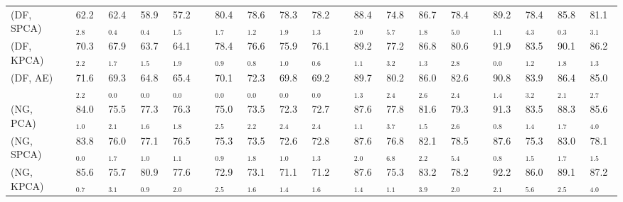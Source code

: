 \begin{table*}[!t]
{\begin{tabular}{llllllllllllllllllllll}
\multicolumn{2}{l}{(DF, SPCA)}         &  & 62.2$_{2.8}$          & 62.4$_{0.4}$          & 58.9$_{0.4}$          & 57.2$_{1.5}$          &  & 80.4$_{1.7}$          & 78.6$_{1.2}$          & 78.3$_{1.9}$          & 78.2$_{1.3}$          &  & 88.4$_{2.0}$          & 74.8$_{5.7}$          & 86.7$_{1.8}$          & 78.4$_{5.0}$          &  & 89.2$_{1.1}$          & 78.4$_{4.3}$          & 85.8$_{0.3}$          & 81.1$_{3.1}$          \\
\multicolumn{2}{l}{(DF, KPCA)}         &  & 70.3$_{2.2}$          & 67.9$_{1.7}$          & 63.7$_{1.5}$          & 64.1$_{1.9}$          &  & 78.4$_{0.9}$          & 76.6$_{0.8}$          & 75.9$_{1.0}$          & 76.1$_{0.6}$          &  & 89.2$_{1.1}$          & 77.2$_{3.2}$          & 86.8$_{1.3}$          & 80.6$_{2.8}$          &  & 91.9$_{0.0}$          & 83.5$_{1.2}$          & 90.1$_{1.8}$          & 86.2$_{1.3}$          \\
\multicolumn{2}{l}{(DF, AE)}           &  & 71.6$_{2.2}$          & 69.3$_{0.0}$          & 64.8$_{0.0}$          & 65.4$_{0.0}$          &  & 70.1$_{0.0}$          & 72.3$_{0.0}$          & 69.8$_{0.0}$          & 69.2$_{0.0}$          &  & 89.7$_{1.3}$          & 80.2$_{2.4}$          & 86.0$_{2.6}$          & 82.6$_{2.4}$          &  & 90.8$_{1.4}$          & 83.9$_{3.2}$          & 86.4$_{2.1}$          & 85.0$_{2.7}$          \\ \midrule
\multicolumn{2}{l}{(NG, PCA)}          &  & 84.0$_{1.0}$          & 75.5$_{2.1}$          & 77.3$_{1.6}$          & 76.3$_{1.8}$          &  & 75.0$_{2.5}$          & 73.5$_{2.2}$          & 72.3$_{2.4}$          & 72.7$_{2.4}$          &  & 87.6$_{1.1}$          & 77.8$_{3.7}$          & 81.6$_{1.5}$          & 79.3$_{2.6}$          &  & 91.3$_{0.8}$          & 83.5$_{1.4}$          & 88.3$_{1.7}$          & 85.6$_{4.0}$          \\
\multicolumn{2}{l}{(NG, SPCA)}         &  & 83.8$_{0.0}$          & 76.0$_{1.7}$          & 77.1$_{1.0}$          & 76.5$_{1.1}$          &  & 75.3$_{0.9}$          & 73.5$_{1.8}$          & 72.6$_{1.0}$          & 72.8$_{1.3}$          &  & 87.6$_{2.0}$          & 76.8$_{6.8}$          & 82.1$_{2.2}$          & 78.5$_{5.4}$          &  & 87.6$_{0.8}$          & 75.3$_{1.5}$          & 83.0$_{1.7}$          & 78.1$_{1.5}$          \\
\multicolumn{2}{l}{(NG, KPCA)}         &  & 85.6$_{0.7}$          & 75.7$_{3.1}$          & 80.9$_{0.9}$          & 77.6$_{2.0}$          &  & 72.9$_{2.5}$          & 73.1$_{1.6}$          & 71.1$_{1.4}$          & 71.2$_{1.6}$          &  & 87.6$_{1.4}$          & 75.3$_{1.1}$          & 83.2$_{3.9}$          & 78.2$_{2.0}$          &  & 92.2$_{2.1}$          & 86.0$_{5.6}$          & 89.1$_{2.5}$          & 87.2$_{4.0}$          \\

\end{tabular}}
\end{table*}
